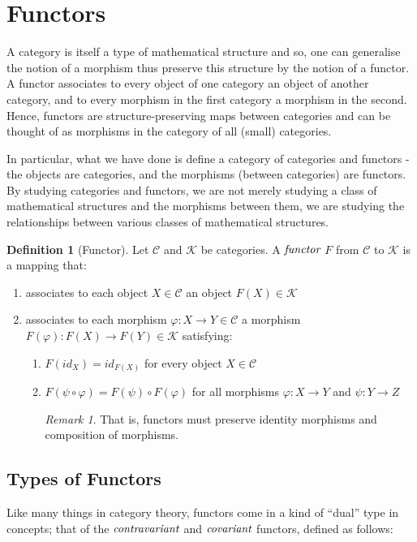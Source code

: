 \documentclass[10pt, oneside, reqno]{amsart}
\theoremstyle{plain}%
\theoremstyle{definition}
\newtheorem{defn}[thm]{Definition}
\theoremstyle{remark}
\newtheorem*{rem}{Remark}
\begin{document}
\section{Functors} %
\label{sec:functors}
A category is itself a type of mathematical structure and so, one can generalise the notion of a morphism thus preserve this structure by the notion of a
functor.
A functor associates to every object of one category an object of another category, and to every morphism in the first category a morphism in the second.
Hence, functors are structure-preserving maps between categories and can be thought of as morphisms in the category of all (small) categories.

In particular, what we have done is define a category of categories and functors - the objects are categories, and the morphisms (between categories) 
are functors.
By studying categories and functors, we are not merely studying a class of mathematical structures and the morphisms between them,
we are studying the relationships between various classes of mathematical structures.

\begin{defn}[Functor]
	Let $\mathcal{C}$ and $\mathcal{K}$ be categories. A $\emph{functor}$ $F$ from $\mathcal{C}$ to $\mathcal{K}$ is a mapping that:
	\begin{enumerate}
		\item associates to each object $X \in \mathcal{C}$ an object $F(X) \in  \mathcal{K}$
		
		\item associates to each morphism $\varphi: X \to Y \in \mathcal{C}$ a morphism $F(\varphi) : F(X) \to F(Y) \in \mathcal{K}$
		satisfying:
		\begin{enumerate}
			\item $F(id_{X}) = id_{F(X)}$ for every object $X \in \mathcal{C}$
			
			\item $F(\psi \circ \varphi) = F(\psi) \circ F(\varphi)$ for all morphisms $\varphi: X \to Y$ and $\psi: Y \to Z$
			\begin{rem}
				That is, functors must preserve identity morphisms and composition of morphisms.
			\end{rem}
		\end{enumerate}
	\end{enumerate}
\end{defn}

\subsection{Types of Functors} %
\label{subsec:functorstypes}
Like many things in category theory, functors come in a kind of ``dual'' type in concepts;
that of the $\emph{contravariant}$ and $\emph{covariant}$ functors, defined as follows:
\end{document}
